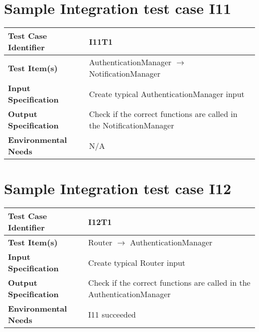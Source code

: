 \section{Sample Integration test case I11}\label{I11}
\begin{center}
	\vspace{0.6cm}
	\begin{tabular}{|l|l|}
		\hline
		\textbf{Test Case Identifier} & I11T1 \bigstrut \\\hline
		\textbf{Test Item(s)} & AuthenticationManager \ensuremath{\rightarrow} NotificationManager \bigstrut \\\hline
		\textbf{Input Specification} & Create typical AuthenticationManager input \bigstrut \\\hline
		\textbf{Output Specification} & Check if the correct functions are called in the NotificationManager \bigstrut \\\hline
		\textbf{Environmental Needs} & N/A \bigstrut \\\hline
	\end{tabular}
\end{center}

\section{Sample Integration test case I12}\label{I12}
\begin{center}
	\vspace{0.6cm}
	\begin{tabular}{|l|l|}
		\hline
		\textbf{Test Case Identifier} & I12T1 \bigstrut \\\hline
		\textbf{Test Item(s)} & Router \ensuremath{\rightarrow} AuthenticationManager \bigstrut \\\hline
		\textbf{Input Specification} & Create typical Router input \bigstrut \\\hline
		\textbf{Output Specification} & Check if the correct functions are called in the AuthenticationManager \bigstrut \\\hline
		\textbf{Environmental Needs} & I11 succeeded \bigstrut \\\hline
	\end{tabular}
\end{center}

